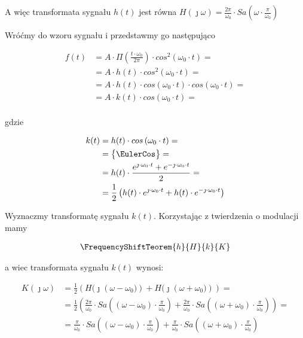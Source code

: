 \begin{task}
A więc transformata sygnału $h(t)$ jest równa $H(\jmath \omega)=\frac{2\pi}{\omega_0} \cdot Sa\left(\omega \cdot \frac{\pi}{\omega_0}\right)$

Wróćmy do wzoru sygnału i przedstawmy go następująco

\begin{align*}
f(t) &= A\cdot \Pi\left(\frac{t \cdot \omega_0}{2\pi}\right) \cdot cos^2\left(\omega_0 \cdot t\right) = \\
&= A\cdot h(t) \cdot cos^2\left(\omega_0 \cdot t\right) = \\
&= A\cdot h(t) \cdot cos\left(\omega_0 \cdot t\right) \cdot cos\left(\omega_0 \cdot t\right) = \\
&= A\cdot k(t) \cdot cos\left(\omega_0 \cdot t\right) = \\
\end{align*}

gdzie

\begin{align*}
k(t) &= h(t) \cdot cos\left(\omega_0 \cdot t\right) = \\
&=\begin{Bmatrix}
\EulerCos
\end{Bmatrix}=\\
& = h(t) \cdot \frac{e^{\jmath \cdot \omega_0 \cdot t} + e^{-\jmath \cdot \omega_0 \cdot t}}{2} = \\
& = \frac{1}{2} \left( h(t) \cdot e^{\jmath \cdot \omega_0 \cdot t} + h(t) \cdot e^{-\jmath \cdot \omega_0 \cdot t} \right)
\end{align*}

Wyznaczmy transformatę sygnału $k(t)$. Korzystając z twierdzenia o modulacji mamy

\begin{align*}
\FrequencyShiftTeorem{h}{H}{k}{K}
\end{align*}

a wiec transformata sygnału $k(t)$ wynosi:

\begin{align*}
K(\jmath \omega)&=\frac{1}{2} \left( H(\jmath \left(\omega -\omega_0)\right) + H(\jmath \left(\omega + \omega_0)\right) \right) = \\
&=\frac{1}{2} \left( \frac{2\pi}{\omega_0} \cdot Sa\left(\left(\omega - \omega_0 \right)\cdot \frac{\pi}{\omega_0}\right) +\frac{2\pi}{\omega_0} \cdot Sa\left(\left(\omega+\omega_0\right) \cdot \frac{\pi}{\omega_0}\right) \right) = \\
&=\frac{\pi}{\omega_0} \cdot Sa\left(\left(\omega - \omega_0 \right)\cdot \frac{\pi}{\omega_0}\right) +\frac{\pi}{\omega_0} \cdot Sa\left(\left(\omega+\omega_0\right) \cdot \frac{\pi}{\omega_0}\right)
\end{align*}


\end{task}
